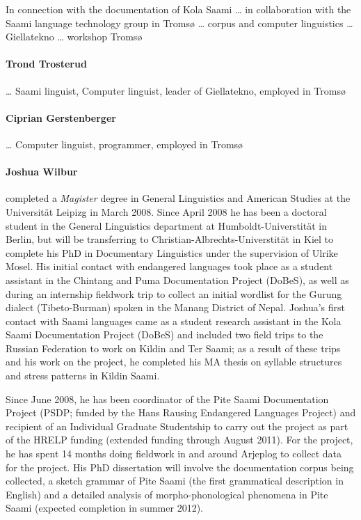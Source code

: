 \documentclass[a4paper,12pt]{article}
\begin{document}
In connection with the documentation of Kola Saami … in collaboration with the Saami language technology group in Tromsø … corpus and computer linguistics … Giellatekno … workshop Tromsø

\paragraph{Trond Trosterud} … Saami linguist, Computer linguist, leader of Giellatekno, employed in Tromsø

\paragraph{Ciprian Gerstenberger} … Computer linguist, programmer, employed in Tromsø

\paragraph{Joshua Wilbur} completed a \textit{Magister} degree in General Linguistics and American Studies at the Universität Leipizg in March 2008. Since April 2008 he has been a doctoral student in the General Linguistics department at Humboldt-Universtität in Berlin, but will be transferring to Christian-Albrechts-Universtität in Kiel to complete his PhD in Documentary Linguistics under the supervision of Ulrike Mosel. 
His initial contact with endangered languages took place as a student assistant in the Chintang and Puma Documentation Project (DoBeS), as well as during an internship fieldwork trip to collect an initial wordlist for the Gurung dialect (Tibeto-Burman) spoken in the Manang District of Nepal. Joshua's first contact with Saami languages came as a student research assistant in the Kola Saami Documentation Project (DoBeS) and included two field trips to the Russian Federation to work on Kildin and Ter Saami; as a result of these trips and his work on the project, he completed his MA thesis on syllable structures and stress patterns in Kildin Saami.

Since June 2008, he has been coordinator of the Pite Saami Documentation Project (PSDP; funded by the Hans Rausing Endangered Languages Project) and recipient of an Individual Graduate Studentship to carry out the project as part of the HRELP funding (extended funding through August 2011). For the project, he has spent 14 months doing fieldwork in and around Arjeplog to collect data for the project. His PhD dissertation will involve the documentation corpus being collected, a sketch grammar of Pite Saami (the first grammatical description in English) and a detailed analysis of morpho-phonological phenomena in Pite Saami (expected completion in summer 2012).
\end{document}
